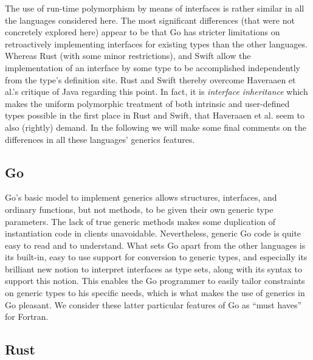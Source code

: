 \documentclass[11pt,oneside]{report}
\begin{document}
The use of run-time polymorphism by means of interfaces is rather
similar in all the languages considered here. The most significant
differences (that were not concretely explored here) appear to be that
Go has stricter limitations on retroactively implementing interfaces
for existing types than the other languages. Whereas Rust (with some
minor restrictions), and Swift allow the implementation of an interface
by some type to be accomplished independently from the type's
definition site. Rust and Swift thereby overcome Haveraaen et al.'s
critique \cite{Haveraaen_et_al_19} of Java regarding this point. In
fact, it is \emph{interface inheritance} which makes the uniform
polymorphic treatment of both intrinsic and user-defined types
possible in the first place in Rust and Swift, that Haveraaen et
al. seem to also (rightly) demand. In the following we will make some
final comments on the differences in all these languages' generics
features.

\subsection{Go}

Go's basic model to implement generics allows structures, interfaces,
and ordinary functions, but not methods, to be given their own generic
type parameters. The lack of true generic methods makes some
duplication of instantiation code in clients
unavoidable. Nevertheless, generic Go code is quite easy to read and
to understand. What sets Go apart from the other languages is its
built-in, easy to use support for conversion to generic types, and
especially its brilliant new notion to interpret interfaces as type
sets, along with its syntax to support this notion. This enables the
Go programmer to easily tailor constraints on generic types to his
specific needs, which is what makes the use of generics in Go
pleasant. We consider these latter particular features of Go as ``must
haves'' for Fortran.

\subsection{Rust}
\end{document}

